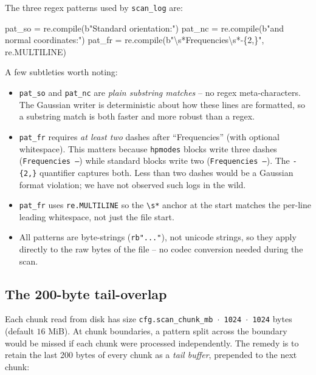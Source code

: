 \documentclass[10pt,a4paper,twoside]{article}
\newcommand{\fn}[1]{\texttt{#1}}
\begin{document}
The three regex patterns used by \fn{scan\_log} are:

\begin{bytebox}
pat\_so = re.compile(b"Standard orientation:")
pat\_nc = re.compile(b"and normal coordinates:")
pat\_fr = re.compile(b"\textbackslash{}s*Frequencies\textbackslash{}s*-\{2,\}",
                     re.MULTILINE)
\end{bytebox}

A few subtleties worth noting:
\begin{itemize}
  \item \texttt{pat\_so} and \texttt{pat\_nc} are \emph{plain
        substring matches} -- no regex meta-characters. The
        Gaussian writer is deterministic about how these lines are
        formatted, so a substring match is both faster and more
        robust than a regex.
  \item \texttt{pat\_fr} requires \emph{at least two} dashes after
        ``Frequencies'' (with optional whitespace). This matters
        because \texttt{hpmodes} blocks write three dashes
        (\texttt{Frequencies ---}) while standard blocks write two
        (\texttt{Frequencies --}). The \texttt{-\{2,\}} quantifier
        captures both. Less than two dashes would be a Gaussian
        format violation; we have not observed such logs in the
        wild.
  \item \texttt{pat\_fr} uses \texttt{re.MULTILINE} so the
        \texttt{\textbackslash{}s*} anchor at the start matches the
        per-line leading whitespace, not just the file start.
  \item All patterns are byte-strings (\texttt{rb"..."}), not
        unicode strings, so they apply directly to the raw bytes
        of the file -- no codec conversion needed during the scan.
\end{itemize}

\subsection{The 200-byte tail-overlap}
\label{sec:scan-tail}

Each chunk read from disk has size \texttt{cfg.scan\_chunk\_mb
{$\cdot$} 1024 {$\cdot$} 1024} bytes (default $16$ MiB). At chunk
boundaries, a pattern split across the boundary would be missed if
each chunk were processed independently. The remedy is to retain
the last 200 bytes of every chunk as a \emph{tail buffer}, prepended
to the next chunk:
\end{document}
